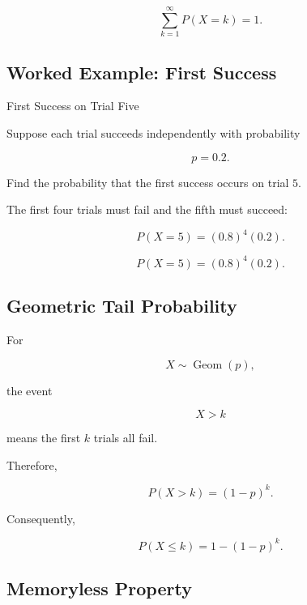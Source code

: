\[
\boxed{
\sum_{k=1}^{\infty}
P(X=k)=1.
}
\]

\subsection{Worked Example: First Success}
\label{subsec:worked-geometric}

\begin{workedexamplebox}{First Success on Trial Five}

Suppose each trial succeeds independently with probability

\[
p=0.2.
\]

Find the probability that the first success occurs on trial \(5\).

The first four trials must fail and the fifth must succeed:

\[
P(X=5)
=
(0.8)^4(0.2).
\]

\begin{answerbox}
\[
\boxed{
P(X=5)
=
(0.8)^4(0.2).
}
\]
\end{answerbox}

\end{workedexamplebox}

\subsection{Geometric Tail Probability}
\label{subsec:geometric-tail}

For

\[
X\sim\operatorname{Geom}(p),
\]

the event

\[
X>k
\]

means the first \(k\) trials all fail.

Therefore,

\[
\boxed{
P(X>k)
=
(1-p)^k.
}
\]

Consequently,

\[
\boxed{
P(X\leq k)
=
1-(1-p)^k.
}
\]

\subsection{Memoryless Property}
\label{subsec:geometric-memoryless}

